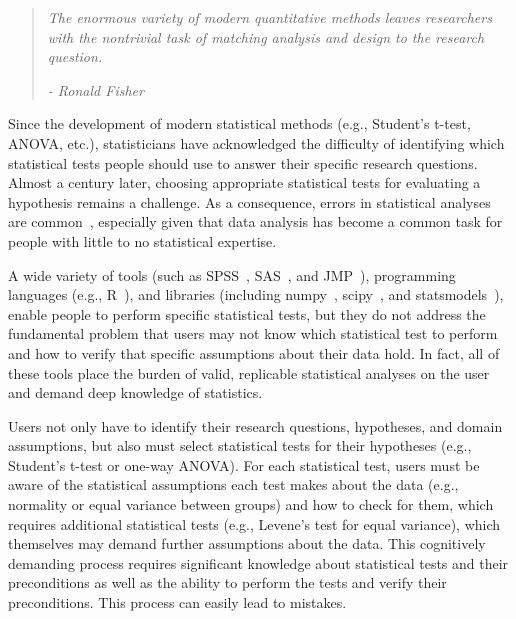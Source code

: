 \begin{flushright}
    \begin{quote}
        \textit{
        The enormous variety of modern quantitative methods leaves researchers with the
        nontrivial task of matching analysis and design to the research question.} \\ 
        \vspace{-10pt}
        \begin{flushright}
            \textit{                                 - Ronald Fisher~\cite{fisher1937design}}
        \end{flushright}
    \end{quote}
\end{flushright}
    
Since the development of modern statistical methods (e.g., Student's t-test,
ANOVA, etc.), statisticians have acknowledged the difficulty of identifying
which statistical tests people should use to answer their specific research
questions. Almost a century later, choosing appropriate statistical tests for
evaluating a hypothesis remains a challenge. As a consequence, errors in
statistical analyses are common~\cite{kaptein2012rethinking}, especially given
that data analysis has become a common task for people with little to no
statistical expertise.

A wide variety of tools (such as SPSS~\cite{wiki:spss}, SAS~\cite{wiki:sas}, and
JMP~\cite{wiki:jmp}), programming languages (e.g., R~\cite{wiki:r-language}),
and libraries (including numpy~\cite{oliphant2006numpy}, scipy~\cite{scipy}, and
statsmodels~\cite{statsmodelsPaper}), enable people to perform specific
statistical tests, but they do not address the fundamental problem that users
may not know which statistical test to perform and how to verify that specific
assumptions about their data hold. In fact, all of these tools place the burden
of valid, replicable statistical analyses on the user and demand deep knowledge
of statistics.

Users not only have to identify their research questions, hypotheses, and domain
assumptions, but also must select statistical tests for their hypotheses (e.g.,
Student's t-test or one-way ANOVA). For each statistical test, users must be
aware of the statistical assumptions each test makes about the data (e.g.,
normality or equal variance between groups) and how to check for them, which
requires additional statistical tests (e.g., Levene's test for equal variance),
which themselves may demand further assumptions about the data. This cognitively
demanding process requires significant knowledge about statistical tests
and their preconditions as well as the ability to perform the tests and verify their
preconditions. This process can easily lead to mistakes.

